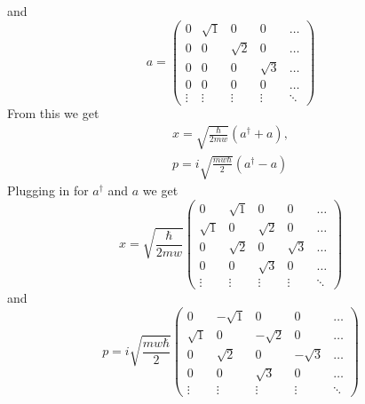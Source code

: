 \documentclass[12pt]{article}
\begin{document}
and
\[ a= \left( \begin{array}{ccccc}
0 & \sqrt{1}  & 0 & 0 & \ldots \\
0 & 0 & \sqrt{2}  & 0 & \ldots \\
0 & 0 & 0 & \sqrt{3}  & \ldots \\
0 & 0 & 0 & 0 & \ldots \\
\vdots & \vdots & \vdots & \vdots & \ddots \end{array} \right)\]
From this we get
\begin{gather}
x = \sqrt{\frac{\hbar}{2mw}}(a^\dagger + a), \\
p = i\sqrt{\frac{mw\hbar}{2}}(a^\dagger - a)
\end{gather}
Plugging in for $a^\dagger$ and $a$ we get
\[ x= \sqrt{\frac{\hbar}{2mw}} \left( \begin{array}{ccccc}
0 & \sqrt{1}  & 0 & 0 & \ldots \\
\sqrt{1} & 0 & \sqrt{2}  & 0 & \ldots \\
0 & \sqrt{2} & 0 & \sqrt{3}  & \ldots \\
0 & 0 & \sqrt{3} & 0 & \ldots \\
\vdots & \vdots & \vdots & \vdots & \ddots \end{array} \right)\]
and
\[ p= i\sqrt{\frac{mw\hbar}{2}} \left( \begin{array}{ccccc}
0 & -\sqrt{1}  & 0 & 0 & \ldots \\
\sqrt{1} & 0 & -\sqrt{2}  & 0 & \ldots \\
0 & \sqrt{2} & 0 & -\sqrt{3}  & \ldots \\
0 & 0 & \sqrt{3} & 0 & \ldots \\
\vdots & \vdots & \vdots & \vdots & \ddots \end{array} \right)\]
\end{document}
